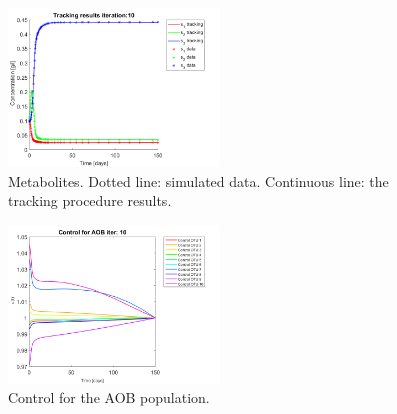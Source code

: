 \documentclass[3p,times]{elsarticle}
\begin{document}
\begin{figure}[h]
	\centering
	\includegraphics[width=0.5\textwidth]{Synthetic_data//lambda_=_e-1//191210_no_noise_metabolites_iter_10}
	\caption{Metabolites. Dotted line: simulated data. Continuous line: the tracking procedure results.}
	\label{Metabolites no noise e1}
\end{figure}

\begin{figure}[h]
	\centering
	\includegraphics[width=0.5\textwidth]{Synthetic_data//lambda_=_e-1//191210_no_noise_Control_AOB_iter_10_plot_1}
	\caption{Control for the AOB population.}
	\label{Control AOB no noise e1}
\end{figure}
\end{document}
